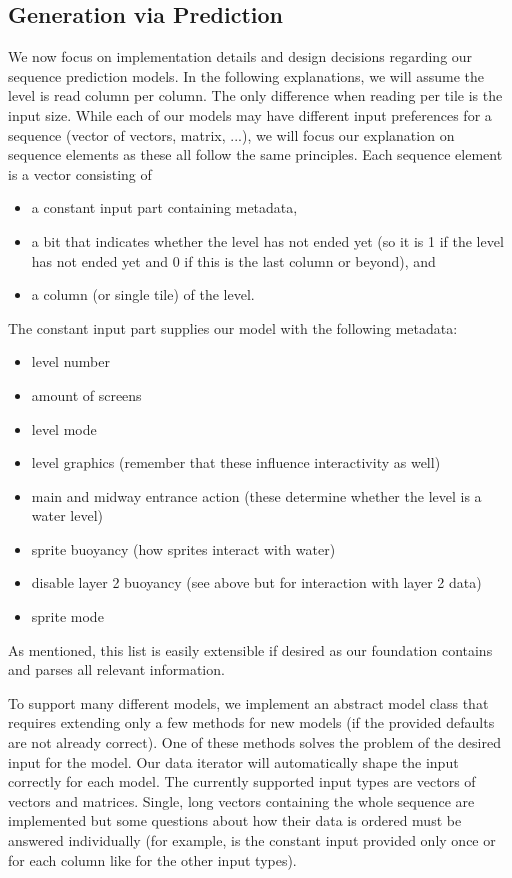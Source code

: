 \subsection{Generation via Prediction}

We now focus on implementation details and design decisions regarding
our sequence prediction models. In the following explanations, we will
assume the level is read column per column. The only difference when
reading per tile is the input size. While each of our models may have
different input preferences for a sequence (vector of vectors, matrix,
...), we will focus our explanation on sequence elements as these all
follow the same principles. Each sequence element is a vector
consisting of
\begin{itemize}
\item a constant input part containing metadata,
\item a bit that indicates whether the level has not ended yet (so it
  is 1 if the level has not ended yet and 0 if this is the last column
  or beyond), and
\item a column (or single tile) of the level.
\end{itemize}
The constant input part supplies our model with the following
metadata:
\begin{itemize}
\item level number
\item amount of screens
\item level mode
\item level graphics (remember that these influence interactivity as well)
\item main and midway entrance action (these determine whether the
  level is a water level)
\item sprite buoyancy (how sprites interact with water)
\item disable layer 2 buoyancy (see above but for interaction with layer 2 data)
\item sprite mode
\end{itemize}
As mentioned, this list is easily extensible if desired as our
foundation contains and parses all relevant information.

To support many different models, we implement an abstract model class
that requires extending only a few methods for new models (if the
provided defaults are not already correct). One of these methods
solves the problem of the desired input for the model. Our data
iterator will automatically shape the input correctly for each model.
The currently supported input types are vectors of vectors and
matrices. Single, long vectors containing the whole sequence are
implemented but some questions about how their data is ordered must be
answered individually (for example, is the constant input provided
only once or for each column like for the other input types).

